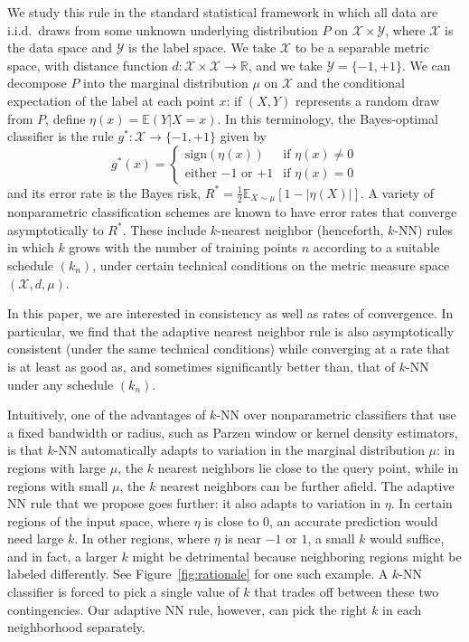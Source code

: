 \documentclass{article}
\def\R{{\mathbb{R}}}
\def\E{{\mathbb E}}
\def\X{{\mathcal X}}
\def\Y{{\mathcal Y}}
\newcommand{\sign}{\mbox{sign}}
\begin{document}
We study this rule in the standard statistical framework in which all data are
i.i.d.\ draws from some unknown underlying distribution $P$ on $\X
\times \Y$, where $\X$ is the data space and $\Y$ is the label
space. We take $\X$ to be a separable metric space, with distance
function $d: \X \times \X \rightarrow \R$, and we take $\Y =
\{-1,+1\}$. We can decompose $P$ into the
marginal distribution $\mu$ on $\X$ and the conditional expectation of
the label at each point $x$: if $(X,Y)$ represents a random draw from
$P$, define $\eta(x) = \E(Y| X = x)$. In this terminology, the
Bayes-optimal classifier is the rule $g^*: \X \rightarrow \{-1,+1\}$
given by
\begin{equation}
g^*(x) = 
\left\{
\begin{array}{ll}
\sign(\eta(x)) & \mbox{if $\eta(x) \neq 0$} \\
\mbox{either $-1$ or $+1$} & \mbox{if $\eta(x) = 0$}
\end{array}
\right.
\label{eq:bayes-opt}
\end{equation}
and its error rate is the Bayes risk, $R^* = \frac{1}{2}\E_{X \sim \mu} \left[1-|\eta(X)| \right]$. A variety of nonparametric classification schemes are known to have error rates that converge asymptotically to $R^*$. These include $k$-nearest neighbor (henceforth, $k$-NN) rules~\cite{FH51} in which $k$ grows with the number of training points $n$ according to a suitable schedule $(k_n)$, under certain technical conditions on the metric measure space $(\X, d, \mu)$.

In this paper, we are interested in consistency as well as rates of
convergence. In particular, we find that the adaptive nearest neighbor
rule is also asymptotically consistent (under the same technical
conditions) while converging at a rate that is at least as good as,
and sometimes significantly better than, that of $k$-NN
under any schedule $(k_n)$.

Intuitively, one of the advantages of $k$-NN over nonparametric
classifiers that use a fixed bandwidth or radius, such as Parzen
window or kernel density estimators, is that $k$-NN automatically
adapts to variation in the marginal distribution $\mu$: in regions
with large $\mu$, the $k$ nearest neighbors lie close to the query
point, while in regions with small $\mu$, the $k$ nearest neighbors
can be further afield. The adaptive NN rule that we propose goes
further: it also adapts to variation in $\eta$. In certain regions of
the input space, where $\eta$ is close to $0$, an accurate
prediction would need large $k$. In other regions, where $\eta$ is
near $-1$ or $1$, a small $k$ would suffice, and in fact, a larger $k$
might be detrimental because neighboring regions might be labeled
differently. See Figure~\ref{fig:rationale} for one such example. A
$k$-NN classifier is forced to pick a single value of $k$ that trades
off between these two contingencies. Our adaptive NN rule, however,
can pick the right $k$ in each neighborhood separately.
\end{document}
